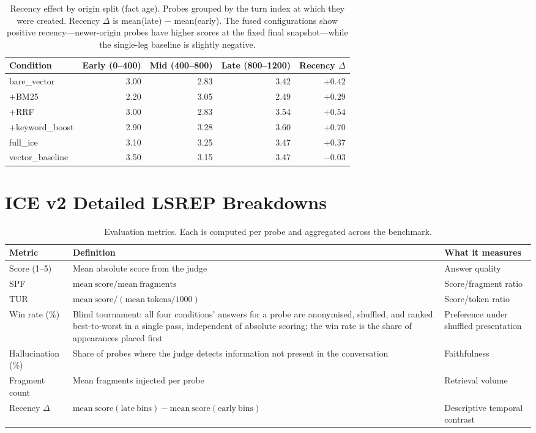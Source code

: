 \documentclass[11pt,a4paper]{article}
\begin{document}
\begin{table}[htbp]
\centering
\small
\caption{Recency effect by origin split (fact age). Probes grouped by the turn index at which they were created. Recency $\Delta$ is mean(late) $-$ mean(early). The fused configurations show positive recency---newer-origin probes have higher scores at the fixed final snapshot---while the single-leg baseline is slightly negative.}
\label{tab:ablation-recency}
\begin{tabular}{@{}lrrrr@{}}
\toprule
\textbf{Condition} & \textbf{Early (0--400)} & \textbf{Mid (400--800)} & \textbf{Late (800--1200)} & \textbf{Recency $\Delta$} \\
\midrule
bare\_vector       & 3.00 & 2.83 & 3.42 & $+0.42$ \\
$+$BM25            & 2.20 & 3.05 & 2.49 & $+0.29$ \\
$+$RRF             & 3.00 & 2.83 & 3.54 & $+0.54$ \\
$+$keyword\_boost  & 2.90 & 3.28 & 3.60 & $+0.70$ \\
full\_ice          & 3.10 & 3.25 & 3.47 & $+0.37$ \\
vector\_baseline   & 3.50 & 3.15 & 3.47 & $-0.03$ \\
\bottomrule
\end{tabular}
\end{table}

\FloatBarrier
\section{ICE v2 Detailed LSREP Breakdowns}

\begin{table}[htbp]
\centering
\small
\caption{Evaluation metrics. Each is computed per probe and aggregated across the benchmark.}
\label{tab:metrics}
\begin{tabular}{@{}L{2.2cm}L{6.2cm}L{4.2cm}@{}}
\toprule
\textbf{Metric} & \textbf{Definition} & \textbf{What it measures} \\
\midrule
Score (1--5) & Mean absolute score from the judge & Answer quality \\
SPF & $\mathrm{mean\ score} / \mathrm{mean\ fragments}$ & Score/fragment ratio \\
TUR & $\mathrm{mean\ score} / (\mathrm{mean\ tokens}/1000)$ & Score/token ratio \\
Win rate (\%) & Blind tournament: all four conditions' answers for a probe are anonymised, shuffled, and ranked best-to-worst in a single pass, independent of absolute scoring; the win rate is the share of appearances placed first & Preference under shuffled presentation \\
Hallucination (\%) & Share of probes where the judge detects information not present in the conversation & Faithfulness \\
Fragment count & Mean fragments injected per probe & Retrieval volume \\
Recency $\Delta$ & $\mathrm{mean\ score}(\mathrm{late\ bins}) - \mathrm{mean\ score}(\mathrm{early\ bins})$ & Descriptive temporal contrast \\
\bottomrule
\end{tabular}
\end{table}
\label{app:exp2-detail}
\end{document}
